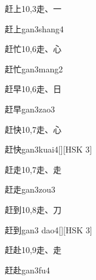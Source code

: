 \begin{entry}{赶上}{10,3}{⾛、⼀}
  \begin{phonetics}{赶上}{gan3shang4}
  \end{phonetics}
\end{entry}

\begin{entry}{赶忙}{10,6}{⾛、⼼}
  \begin{phonetics}{赶忙}{gan3mang2}
  \end{phonetics}
\end{entry}

\begin{entry}{赶早}{10,6}{⾛、⽇}
  \begin{phonetics}{赶早}{gan3zao3}
  \end{phonetics}
\end{entry}

\begin{entry}{赶快}{10,7}{⾛、⼼}
  \begin{phonetics}{赶快}{gan3kuai4}[][HSK 3]
  \end{phonetics}
\end{entry}

\begin{entry}{赶走}{10,7}{⾛、⾛}
  \begin{phonetics}{赶走}{gan3zou3}
  \end{phonetics}
\end{entry}

\begin{entry}{赶到}{10,8}{⾛、⼑}
  \begin{phonetics}{赶到}{gan3 dao4}[][HSK 3]
  \end{phonetics}
\end{entry}

\begin{entry}{赶赴}{10,9}{⾛、⾛}
  \begin{phonetics}{赶赴}{gan3fu4}
  \end{phonetics}
\end{entry}

